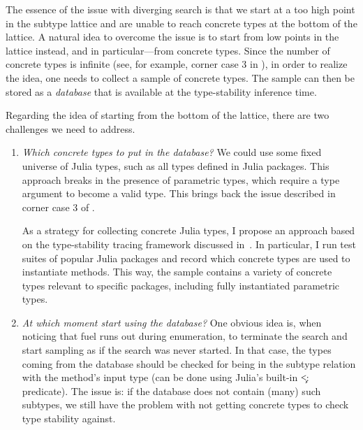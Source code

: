 The essence of the issue with diverging search is that we start at a too high
point in the subtype lattice and are unable to reach concrete types at the
bottom of the lattice. 
A natural idea to overcome the issue is to start from
low points in the lattice instead, and in particular---from concrete types.
Since the number of concrete types is infinite (see, for example,
corner case 3 in ),
in order to realize the idea, one needs to collect a sample of concrete types.
The sample can then be stored as a \emph{database} that is available at the
type-stability inference time.

Regarding the idea of starting from the bottom of the lattice, there are two
challenges we need to address.

\begin{enumerate}

  \item
  \emph{Which concrete types to put in the database?}
We could use some fixed universe of Julia types,
such as all types defined in Julia packages. This approach breaks in the
presence of parametric types, which require a type argument to become a valid
type. This brings back the issue described in
corner case 3 of .

As a strategy for collecting concrete Julia types, I propose an approach based
on the type-stability tracing framework discussed in~. In
particular, I run test suites of popular Julia packages and record which
concrete types are used to instantiate methods.
This way, the sample contains a variety of concrete types relevant to specific
packages, including fully instantiated parametric types.

  \item
  \emph{At which moment start using the database?} %
One obvious idea is, when noticing that fuel runs out during enumeration, to
terminate the search and start sampling as if the search was never started.
In that case, the types coming from the database should be checked for being
in the subtype relation with the method's input type (can be done
using Julia's built-in \c{<:} predicate). The issue is:
if the database does not contain (many) such subtypes,
we still have the problem with not getting concrete types to check type
stability against.


\end{enumerate}
